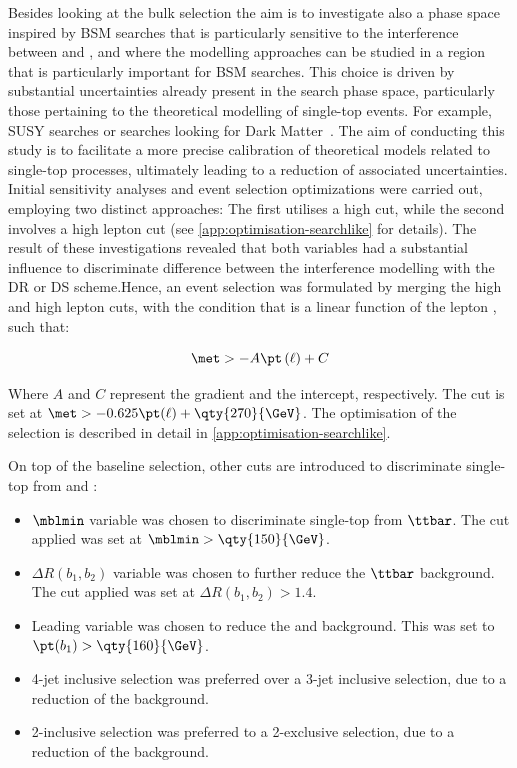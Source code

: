 Besides looking at the bulk selection the aim is to investigate also
a phase space inspired by BSM searches that is particularly sensitive
to the interference between \ttbar and \tW, and where the modelling
approaches can be studied in a region that is particularly
important for BSM searches.
This choice is driven by substantial uncertainties already present
in the search phase space, particularly those pertaining to the theoretical
modelling of single-top events. For example, SUSY searches or searches looking
for Dark Matter~\cite{EXOT-2021-01}. The aim of conducting this study is
to facilitate a more precise calibration of theoretical models related
to single-top processes, ultimately leading to a reduction of associated
uncertainties.
Initial sensitivity analyses and event selection optimizations were carried out,
employing two distinct approaches:
The first utilises a high \met cut, while the second involves a high lepton
\pt cut (see \cref{app:optimisation-searchlike} for details).
The result of these investigations revealed that both variables had a substantial
influence to discriminate difference between the interference
modelling with the DR or DS scheme.\@ Hence, an event selection was
formulated by merging the high \met and high lepton \pt cuts, with the condition
that \met is a linear function of the lepton \pt, such that:

\begin{equation}
  \met > -A\pt\left(\ell\right) + C
\end{equation}

Where \(A\) and \(C\) represent the gradient and the intercept, respectively.
The cut is set at \( \met > -0.625\pt(\ell) + \qty{270}{\GeV} \).
The optimisation of the selection is described in detail
in \cref{app:optimisation-searchlike}.

On top of the baseline selection, other cuts are introduced to discriminate
single-top from \ttbar and \Wjets:
\begin{itemize}
  \item  \( \mblmin \) variable was chosen to discriminate single-top from \( \ttbar \). The cut applied was set at \( \mblmin > \qty{150}{\GeV} \).
  \item \( \Delta R (b_{1}, b_{2}) \) variable was chosen to further reduce the \(\ttbar \) background. The cut applied was set at \( \Delta R (b_{1}, b_{2})  > 1.4\).
  \item Leading \bjet \pt variable was chosen to reduce the \ttbar and \Wjets background. This was set to \( \pt(b_{1}) > \qty{160}{\GeV} \).
  \item 4-jet inclusive selection was preferred over a 3-jet inclusive selection, due to a reduction of the \Wjets background.
  \item 2-\bjet inclusive selection was preferred to a 2-\bjet exclusive selection, due to a reduction of the \Wjets background.
\end{itemize}

